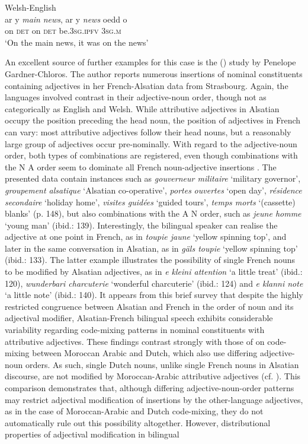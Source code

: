 \ea{\label{ex:4:7}}
Welsh-English \citep[261]{deuchar-congruence-2005}\\
\gll ar y \textit{main} \textit{news}, ar y \textit{news} oedd o\\
	on \textsc{det} {} {} on \textsc{det} {} be.\textsc{3sg.ipfv} \textsc{3sg.m}\\
\glt `On the main news, it was on the news'
\z

An excellent source of further examples for this case is the (\citeyear{gardner-chloros-1991}) study by Penelope Gardner-Chloros. The author reports numerous insertions of nominal constituents containing adjectives in her French-Alsatian data from Strasbourg. Again, the languages involved contrast in their adjective-noun order, though not as categorically as English and Welsh. While attributive adjectives in Alsatian occupy the position preceding the head noun, the position of adjectives in French can vary: most attributive adjectives follow their head nouns, but a reasonably large group of adjectives occur pre-nominally. With regard to the adjective-noun order, both types of combinations are registered, even though combinations with the N A order seem to dominate all French noun-adjective insertions  \citep[cf.][141]{gardner-chloros-1991}. The presented data contain instances such as \textit{gouverneur militaire} `military governor', \textit{groupement alsatique} `Alsatian co-operative', \textit{portes} \textit{ouvertes} `open day', \textit{résidence secondaire} `holiday home', \textit{visites guidées} `guided tours', \textit{temps morts} `(cassette) blanks' (p. 148), but also combinations with the A N order, such as \textit{jeune homme} `young man' (ibid.: 139). Interestingly, the bilingual speaker can realise the adjective at one point in French, as in \textit{toupie jaune} `yellow spinning top', and later in the same conversation in Alsatian, as in \textit{gäls toupie} `yellow spinning top' (ibid.: 133). The latter example illustrates the possibility of single French nouns to be modified by Alsatian adjectives, as in \textit{e kleini attention} `a little treat' (ibid.: 120), \textit{wunderbari charcuterie} `wonderful charcuterie' (ibid.: 124) and  \textit{e klanni note} `a little note' (ibid.: 140). It appears from this brief survey that despite the highly restricted congruence between Alsatian and French in the order of noun and its adjectival modifier, Alsatian-French bilingual speech exhibits considerable variability regarding code-mixing patterns in nominal constituents with attributive adjectives. These findings contrast strongly with those of \citet{boumans-syntax-1998} on code-mixing between Moroccan Arabic and Dutch, which also use differing adjective-noun orders. As such, single Dutch nouns, unlike single French nouns in Alsatian discourse, are not modified by Moroccan-Arabic attributive adjectives (cf. ). This comparison demonstrates that, although differing adjective-noun-order patterns may restrict adjectival modification of insertions by the other-language adjectives, as in the case of Moroccan-Arabic and Dutch code-mixing, they do not automatically rule out this possibility altogether. However, distributional properties of adjectival modification in bilingual 